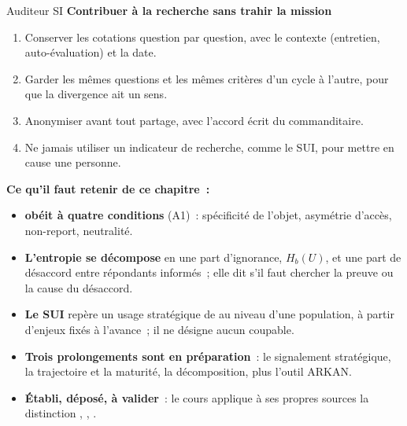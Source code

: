\begin{boxmetier}{Auditeur SI}
\textbf{Contribuer à la recherche sans trahir la mission}
\begin{enumerate}
    \item Conserver les cotations question par question, avec le contexte
          (entretien, auto-évaluation) et la date.
    \item Garder les mêmes questions et les mêmes critères d'un cycle à
          l'autre, pour que la divergence ait un sens.
    \item Anonymiser avant tout partage, avec l'accord écrit du
          commanditaire.
    \item Ne jamais utiliser un indicateur de recherche, comme le SUI, pour
          mettre en cause une personne.
\end{enumerate}
\end{boxmetier}


\separateur

\begin{boxresume}
\textbf{Ce qu'il faut retenir de ce chapitre~:}
\begin{itemize}
    \item \textbf{\NEK{} obéit à quatre conditions} (A1)~: spécificité de
          l'objet, asymétrie d'accès, non-report, neutralité.
    \item \textbf{L'entropie se décompose} en une part d'ignorance,
          $H_b(U)$, et une part de désaccord entre répondants informés~;
          elle dit s'il faut chercher la preuve ou la cause du désaccord.
    \item \textbf{Le SUI} repère un usage stratégique de \NEK{} au niveau
          d'une population, à partir d'enjeux fixés à l'avance~; il ne
          désigne aucun coupable.
    \item \textbf{Trois prolongements sont en préparation}~: le
          signalement stratégique, la trajectoire et la maturité, la
          décomposition, plus l'outil ARKAN.
    \item \textbf{Établi, déposé, à valider}~: le cours applique à ses
          propres sources la distinction \OUI{}, \NON{}, \NEK{}.
\end{itemize}
\end{boxresume}

\bigskip


